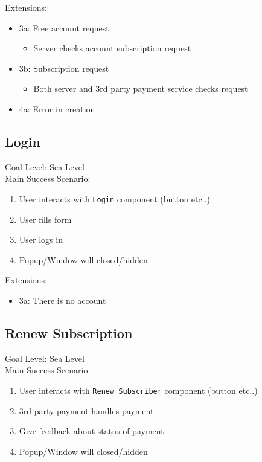 \documentclass[11pt]{article}
\begin{document}
Extensions:
\begin{itemize}
\item 3a: Free account request
\begin{itemize}
\item Server checks account subscription request
\end{itemize}
\item 3b: Subscription request
\begin{itemize}
\item Both server and 3rd party payment service checks request
\end{itemize}
\item 4a: Error in creation
\end{itemize}
\subsection{Login}
\label{sec:org52fc26b}
Goal Level: Sea Level \\
Main Success Scenario: \\

\begin{enumerate}
\item User interacts with \texttt{Login} component (button etc..)
\item User fills form
\item User logs in
\item Popup/Window will closed/hidden
\end{enumerate}

Extensions:
\begin{itemize}
\item 3a: There is no account
\end{itemize}
\subsection{Renew Subscription}
\label{sec:orgba157b9}
Goal Level: Sea Level \\
Main Success Scenario: 

\begin{enumerate}
\item User interacts with \texttt{Renew Subscriber} component (button etc..)
\item 3rd party payment handles payment
\item Give feedback about status of payment
\item Popup/Window will closed/hidden
\end{enumerate}
\end{document}
